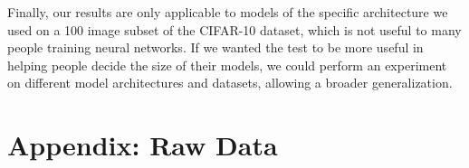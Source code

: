 \documentclass[12pt]{article}
\begin{document}
    Finally, our results are only applicable to models of the specific architecture we used on a 100 image subset of the CIFAR-10 dataset, which is not useful to many people training neural networks.
    If we wanted the test to be more useful in helping people decide the size of their models, we could perform an experiment on different model architectures and datasets, allowing a broader generalization.



    \clearpage


    \appendix
    \section*{Appendix: Raw Data}
\end{document}
